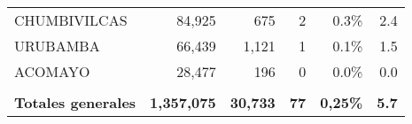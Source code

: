 \begin{tabular}{lrrrrr}
	\cellcolor[HTML]{9AFF99}CHUMBIVILCAS                       & 84,925                                                         & 675                                                                  & 2                                                                & 0.3\%                                                                  & 2.4                                                                                                                                \\
	\cellcolor[HTML]{9AFF99}URUBAMBA                           & 66,439                                                         & 1,121                                                                & 1                                                                & 0.1\%                                                                  & 1.5                                                                                                                                \\
	\cellcolor[HTML]{9AFF99}ACOMAYO                            & 28,477                                                         & 196                                                                  & 0                                                                & 0.0\%                                                                  & 0.0                                                                                                                                \\
	&                                                                &                                                                      &                                                                  &                                                                        &                                                                                                                                    \\
	\rowcolor[HTML]{ECF4FF} 
	\textbf{Totales generales}                                 & \textbf{1,357,075}                                             & \textbf{30,733}                                                      & \textbf{77}                                                      & \textbf{0,25\%}                                                        & \textbf{5.7}                                                                                                                      
\end{tabular}